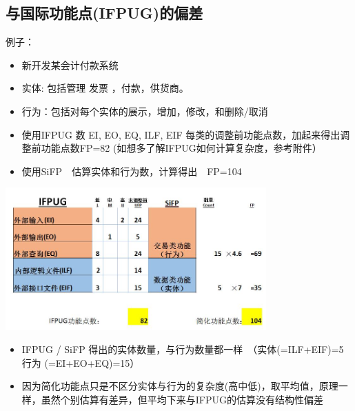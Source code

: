 \hypertarget{ux4e0eux56fdux9645ux529fux80fdux70b9ifpugux7684ux504fux5dee}{%
\subsection{与国际功能点(IFPUG)的偏差}\label{ux4e0eux56fdux9645ux529fux80fdux70b9ifpugux7684ux504fux5dee}}

例子：

\begin{itemize}
\tightlist
\item
  新开发某会计付款系统
\item
  实体: 包括管理 发票 ，付款，供货商。
\item
  行为：包括对每个实体的展示，增加，修改，和删除/取消
\item
  使用IFPUG 数 EI, EO, EQ, ILF, EIF
  每类的调整前功能点数，加起来得出调整前功能点数FP=82
  (如想多了解IFPUG如何计算复杂度，参考附件）
\item
  使用SiFP　估算实体和行为数，计算得出　FP=104
\end{itemize}


\includegraphics[width=10cm]{FPAS11.jpg}

\begin{itemize}
\tightlist
\item
  IFPUG / SiFP
  得出的实体数量，与行为数量都一样　（实体(=ILF+EIF)=5　　行为
  (=EI+EO+EQ)=15）
\item
  因为简化功能点只是不区分实体与行为的复杂度(高中低)，取平均值，原理一样，虽然个别估算有差异，但平均下来与IFPUG的估算没有结构性偏差
\end{itemize}

